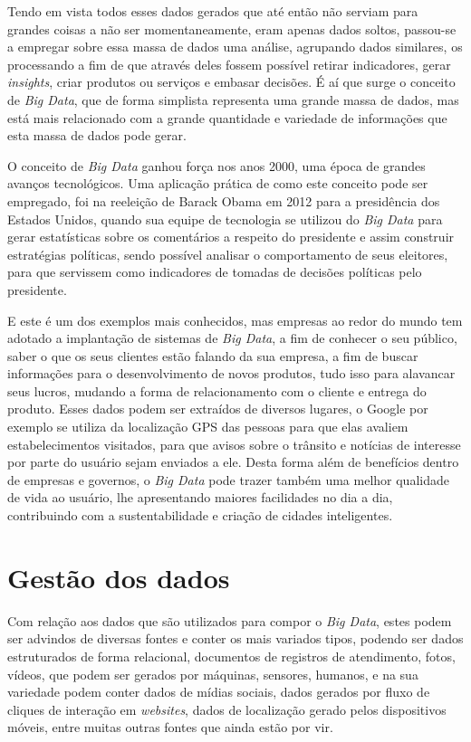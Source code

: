 Tendo em vista todos esses dados gerados que até então não serviam para grandes coisas a não ser momentaneamente, eram apenas dados soltos, passou-se a empregar sobre essa massa de dados uma análise, agrupando dados similares, os processando a fim de que através deles fossem possível retirar indicadores, gerar \textit{insights}, criar produtos ou serviços e embasar decisões. É aí que surge o conceito de \textit{Big Data}, que de forma simplista representa uma grande massa de dados, mas está mais relacionado com a grande quantidade e variedade de informações que esta massa de dados pode gerar.~\cite{navegg}

O conceito de \textit{Big Data} ganhou força nos anos 2000, uma época de grandes avanços tecnológicos. Uma aplicação prática de como este conceito pode ser empregado, foi na reeleição de Barack Obama em 2012 para a presidência dos Estados Unidos, quando sua equipe de tecnologia se utilizou do \textit{Big Data} para gerar estatísticas sobre os comentários a respeito do presidente e assim construir estratégias políticas, sendo possível analisar o comportamento de seus eleitores, para que servissem como indicadores de tomadas de decisões políticas pelo presidente.~\cite{sinha2014making}

E este é um dos exemplos mais conhecidos, mas empresas ao redor do mundo tem adotado a implantação de sistemas de \textit{Big Data}, a fim de conhecer o seu público, saber o que os seus clientes estão falando da sua empresa, a fim de buscar informações para o desenvolvimento de novos produtos, tudo isso para alavancar seus lucros, mudando a forma de relacionamento com o cliente e entrega do produto. Esses dados podem ser extraídos de diversos lugares, o Google por exemplo se utiliza da localização GPS das pessoas para que elas avaliem estabelecimentos visitados, para que avisos sobre o trânsito e notícias de interesse por parte do usuário sejam enviados a ele. Desta forma além de benefícios dentro de empresas e governos, o \textit{Big Data} pode trazer também uma melhor qualidade de vida ao usuário, lhe apresentando maiores facilidades no dia a dia, contribuindo com a sustentabilidade e criação de cidades inteligentes.~\cite{navegg}

\section{Gestão dos dados}
\label{sec:gestaodados}
Com relação aos dados que são utilizados para compor o \textit{Big Data}, estes podem ser advindos de diversas fontes e conter os mais variados tipos, podendo ser dados estruturados de forma relacional, documentos de registros de atendimento, fotos, vídeos, que podem ser gerados por máquinas, sensores, humanos, e na sua variedade podem conter dados de mídias sociais, dados gerados por fluxo de cliques de interação em \textit{websites}, dados de localização gerado pelos dispositivos móveis, entre muitas outras fontes que ainda estão por vir.%

